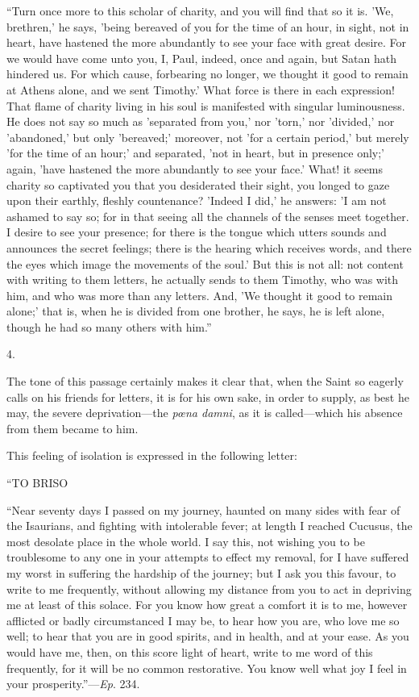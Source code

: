 ``Turn once more to this scholar of charity, and you will find
that so it is. 'We, brethren,' he says, 'being bereaved of you for the
time of an hour, in sight, not in heart, have hastened the more
abundantly to see your face with great desire. For we would have come
unto you, I, Paul, indeed, once and again, but Satan hath hindered us.
For which cause, forbearing no longer, we thought it good to remain at
Athens alone, and we sent Timothy.' What force is there in each
expression! That flame of charity living in his soul is manifested
with singular luminousness. He does not say so much as 'separated from
you,' nor 'torn,' nor 'divided,' nor 'abandoned,' but only 'bereaved;'
moreover, not 'for a certain period,' but merely 'for the time of an
hour;' and separated, 'not in heart, but in presence only;' again,
'have hastened the more abundantly to see your face.' What! it seems
charity so captivated you that you desiderated their sight, you
longed to gaze upon their earthly, fleshly countenance? 'Indeed I
did,' he answers: 'I am not ashamed to say so; for in that seeing all
the channels of the senses meet together. I desire to see your
presence; for there is the tongue which utters sounds and announces
the secret feelings; there is the hearing which receives words, and
there the eyes which image the movements of the soul.' But this is not
all: not content with writing to them letters, he actually sends to
them Timothy, who was with him, and who was more than any letters.
And, 'We thought it good to remain alone;' that is, when he is divided
from one brother, he says, he is left alone, though he had so many
others with him.''

4.

The tone of this passage certainly makes it clear that, when the
Saint so eagerly calls on his friends for letters, it is for his own
sake, in order to supply, as best he may, the severe deprivation—the
\emph{pœna damni}, as it is called—which his absence from them
became to him.

This feeling of isolation is expressed in the following letter:

``TO
BRISO

``Near seventy days I passed on my journey, haunted on many
sides with fear of the Isaurians, and fighting with intolerable fever;
at length I reached Cucusus, the most desolate place in the whole
world. I say this, not wishing you to be troublesome to any one in
your attempts to effect my removal, for I have suffered my worst in
suffering the hardship of the journey; but I ask you this favour, to
write to me frequently, without allowing my distance from you to act
in depriving me at least of this solace. For you know how great a
comfort it is to me, however afflicted or badly circumstanced I may
be, to hear how you are, who love me so well; to hear that you are in
good spirits, and in health, and at your ease. As you would
have me, then, on this score light of heart, write to me word of this
frequently, for it will be no common restorative. You know well what
joy I feel in your prosperity.''—\emph{Ep}. 234.


